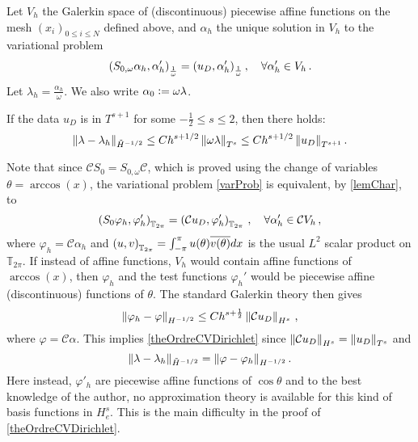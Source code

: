 \documentclass[a4paper]{article}
\begin{document}
 Let $V_h$ the Galerkin space of (discontinuous) piecewise affine functions 
 on the mesh $(x_i)_{0\leq i \leq N}$ defined above, and $\alpha_h$ the unique solution in $V_h$ to the variational problem
 \begin{equation}
 \label{varProb}
 \left( S_{0,\omega} \alpha_h,\alpha_h'\right)_\frac{1}{\omega} = \left( u_D,\alpha_h'\right)_\frac{1}{\omega}, \quad \forall \alpha_h' \in V_h\,.
 \end{equation}
 Let $\lambda_h = \frac{\alpha_h}{\omega}$. We also write $\alpha_0 \mathrel{\mathop:}= \omega \lambda$. 
 \begin{theorem}
 	If the data $u_D$ is in $T^{s+1}$ for some $-\frac{1}{2} \leq s \leq 2$, then there holds:
 	\[ \left\|\lambda - \lambda_h\right\|_{\tilde{H}^{-1/2}} \leq C h^{s+1/2} \left\|\omega \lambda\right\|_{T^{s}}\leq C h^{s+1/2} \left\|u_D\right\|_{T^{s+1}}.\]
 	\label{theOrdreCVDirichlet}
 \end{theorem}
 Note that since $\mathcal{C} S_0 = S_{0,\omega} \mathcal{C}$, which is proved using the change of variables $\theta = \arccos(x)$, the variational problem \eqref{varProb} is equivalent, by \autoref{lemChar}, to 
 \begin{equation*}
 	\left( S_{0}\varphi_h,\varphi_h'\right)_{\mathbb{T}_{2\pi}} = \left( \mathcal{C}u_D,\varphi_h'\right)_{\mathbb{T}_{2\pi}}\,, \quad  \forall \alpha_h' \in \mathcal{C}V_h\,,
 \end{equation*}
where $\varphi_h = \mathcal{C}\alpha_h$ and $\left( u,v\right)_{\mathbb{T}_{2\pi}} = \int_{-\pi}^{\pi} u(\theta) \overline{v(\theta)}dx$ is the usual $L^2$ scalar product on $\mathbb{T}_{2\pi}$. If instead of affine functions, $V_h$ would contain affine functions of $\arccos(x)$, then $\varphi_h$ and the test functions $\varphi_h'$ would be piecewise affine (discontinuous) functions of $\theta$. The standard Galerkin theory then gives
\[\left\|\varphi_h - \varphi\right\|_{H^{-1/2}} \leq Ch^{s + \frac{1}{2}}\left\|\mathcal{C}u_D\right\|_{H^s}\,,\]
where $\varphi = \mathcal{C}\alpha$.   
This implies \autoref{theOrdreCVDirichlet} since
$\left\|\mathcal{C}u_D\right\|_{H^s} = \left\|u_D\right\|_{T^s}$ and \[{\left\|\lambda - \lambda_h\right\|_{\tilde{H}^{-1/2}} = \left\|\varphi - \varphi_h\right\|_{H^{-1/2}}}\,.\] 
Here instead, $\varphi'_h$ are piecewise affine functions of $\cos\theta$ and to the best knowledge of the author, no approximation theory is available for this kind of basis functions in $H^s_e$. This is the main difficulty in the proof of \autoref{theOrdreCVDirichlet}. 
\end{document}
